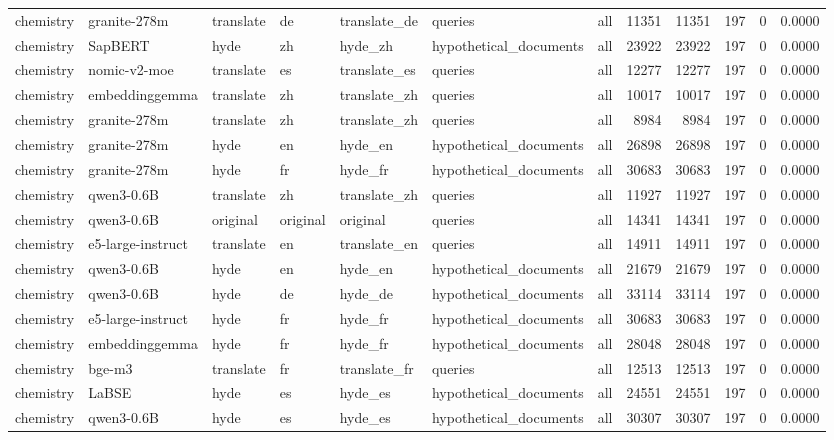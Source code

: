 \begin{tabular}{lllllllrrrrr}
chemistry & granite-278m & translate & de & translate\_de & queries & all & 11351 & 11351 & 197 & 0 & 0.0000 \\
chemistry & SapBERT & hyde & zh & hyde\_zh & hypothetical\_documents & all & 23922 & 23922 & 197 & 0 & 0.0000 \\
chemistry & nomic-v2-moe & translate & es & translate\_es & queries & all & 12277 & 12277 & 197 & 0 & 0.0000 \\
chemistry & embeddinggemma & translate & zh & translate\_zh & queries & all & 10017 & 10017 & 197 & 0 & 0.0000 \\
chemistry & granite-278m & translate & zh & translate\_zh & queries & all & 8984 & 8984 & 197 & 0 & 0.0000 \\
chemistry & granite-278m & hyde & en & hyde\_en & hypothetical\_documents & all & 26898 & 26898 & 197 & 0 & 0.0000 \\
chemistry & granite-278m & hyde & fr & hyde\_fr & hypothetical\_documents & all & 30683 & 30683 & 197 & 0 & 0.0000 \\
chemistry & qwen3-0.6B & translate & zh & translate\_zh & queries & all & 11927 & 11927 & 197 & 0 & 0.0000 \\
chemistry & qwen3-0.6B & original & original & original & queries & all & 14341 & 14341 & 197 & 0 & 0.0000 \\
chemistry & e5-large-instruct & translate & en & translate\_en & queries & all & 14911 & 14911 & 197 & 0 & 0.0000 \\
chemistry & qwen3-0.6B & hyde & en & hyde\_en & hypothetical\_documents & all & 21679 & 21679 & 197 & 0 & 0.0000 \\
chemistry & qwen3-0.6B & hyde & de & hyde\_de & hypothetical\_documents & all & 33114 & 33114 & 197 & 0 & 0.0000 \\
chemistry & e5-large-instruct & hyde & fr & hyde\_fr & hypothetical\_documents & all & 30683 & 30683 & 197 & 0 & 0.0000 \\
chemistry & embeddinggemma & hyde & fr & hyde\_fr & hypothetical\_documents & all & 28048 & 28048 & 197 & 0 & 0.0000 \\
chemistry & bge-m3 & translate & fr & translate\_fr & queries & all & 12513 & 12513 & 197 & 0 & 0.0000 \\
chemistry & LaBSE & hyde & es & hyde\_es & hypothetical\_documents & all & 24551 & 24551 & 197 & 0 & 0.0000 \\
chemistry & qwen3-0.6B & hyde & es & hyde\_es & hypothetical\_documents & all & 30307 & 30307 & 197 & 0 & 0.0000 \\

\end{tabular}
